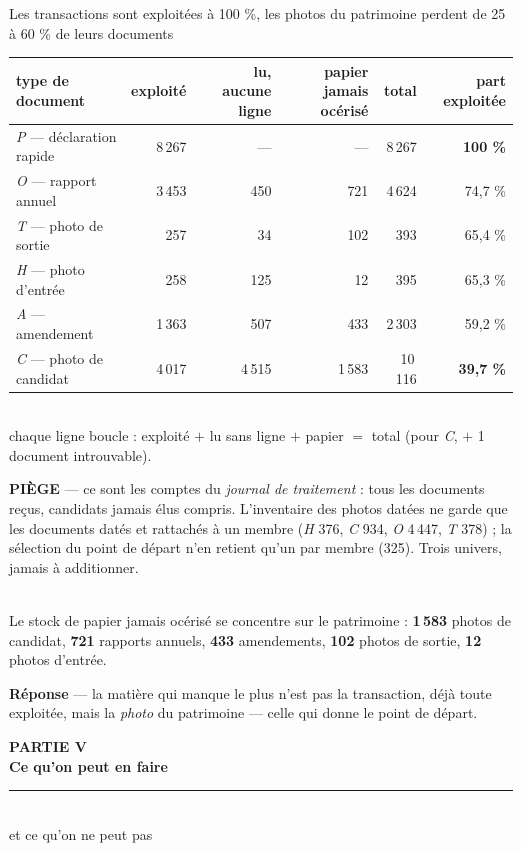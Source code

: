 \documentclass[11pt,aspectratio=169]{beamer}
\newcommand{\repband}[1]{%
  \colorbox{okgreen!12}{\parbox{\dimexpr\textwidth-10pt}{\scriptsize
    \textbf{\textcolor{okgreen}{Réponse}}\; --- #1}}}
\newcommand{\piege}[1]{%
  \colorbox{warnorange!12}{\parbox{\dimexpr\linewidth-8pt}{\scriptsize
    \textbf{\textcolor{warnorange}{PIÈGE}}\; --- #1}}}
\newcommand{\chapdivider}[3]{%
  \begin{frame}[plain]
    \centering\vfill
    {\color{helec!85}\large\textbf{#1}}\\[3.5mm]
    {\color{black!88}\fontsize{29}{33}\selectfont\textbf{#2}}\\[4mm]
    {\color{helec!45}\rule{0.30\textwidth}{1.2pt}}\\[4mm]
    {\color{black!55}\large #3}
    \vfill
  \end{frame}}
\begin{document}
\begin{frame}{Les transactions sont exploitées à 100 \%, les photos du patrimoine perdent de 25 à 60 \% de leurs documents}
  \centering
  {\footnotesize\begin{tabular}{l r r r r r}
    \toprule
    type de document & exploité & lu, aucune ligne & papier jamais océrisé & total & part exploitée\\
    \midrule
    \emph{P} --- déclaration rapide & 8\,267 & --- & --- & 8\,267 & \textbf{100 \%}\\
    \emph{O} --- rapport annuel     & 3\,453 & 450 & 721 & 4\,624 & 74,7 \%\\
    \emph{T} --- photo de sortie    & 257 & 34 & 102 & 393 & 65,4 \%\\
    \emph{H} --- photo d'entrée     & 258 & 125 & 12 & 395 & 65,3 \%\\
    \emph{A} --- amendement         & 1\,363 & 507 & 433 & 2\,303 & 59,2 \%\\
    \emph{C} --- photo de candidat  & 4\,017 & 4\,515 & 1\,583 & 10\,116 & \textbf{39,7 \%}\\
    \bottomrule
  \end{tabular}}\\[1mm]
  {\scriptsize\color{black!55} chaque ligne boucle : exploité $+$ lu sans ligne $+$ papier $=$ total
  (pour \emph{C}, $+$ 1 document introuvable).}\\[1.5mm]
  \piege{ce sont les comptes du \emph{journal de traitement} : tous les documents reçus, candidats
  jamais élus compris. L'inventaire des photos datées ne garde que les documents datés et rattachés
  à un membre (\emph{H} 376, \emph{C} 934, \emph{O} 4\,447, \emph{T} 378) ; la sélection du point
  de départ n'en retient qu'un par membre (325). Trois univers, jamais à additionner.}\\[1.5mm]
  {\scriptsize Le stock de papier jamais océrisé se concentre sur le patrimoine :
  \textbf{1\,583} photos de candidat, \textbf{721} rapports annuels, \textbf{433} amendements,
  \textbf{102} photos de sortie, \textbf{12} photos d'entrée.}\\[1.5mm]
  \repband{la matière qui manque le plus n'est pas la transaction, déjà toute exploitée, mais la
  \emph{photo} du patrimoine --- celle qui donne le point de départ.}
\end{frame}

\chapdivider{PARTIE V}{Ce qu'on peut en faire}{et ce qu'on ne peut pas}
\end{document}

